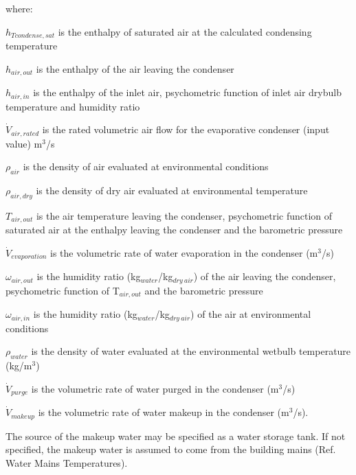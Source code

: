 where:

\({h_{Tcondense,sat}}\) is the enthalpy of saturated air at the calculated condensing temperature

\(h_{air,out}\) is the enthalpy of the air leaving the condenser

\(h_{air,in}\) is the enthalpy of the inlet air, psychometric function of inlet air drybulb temperature and humidity ratio

\({\dot V_{air,rated}}\) is the rated volumetric air flow for the evaporative condenser (input value) m\(^{3}\)/s

\(\rho_{air}\) is the density of air evaluated at environmental conditions

\(\rho_{air,dry}\) is the density of dry air evaluated at environmental temperature

\(T_{air,out}\) is the air temperature leaving the condenser, psychometric function of saturated air at the enthalpy leaving the condenser and the barometric pressure

\({\dot V_{evaporation}}\) is the volumetric rate of water evaporation in the condenser (m\(^{3}\)/s)

\(\omega_{air,out}\) is the humidity ratio (kg\(_{water}\)/kg\(_{dry~air}\)) of the air leaving the condenser, psychometric function of T\(_{air,out}\) and the barometric pressure

\(\omega_{air,in}\) is the humidity ratio (kg\(_{water}\)/kg\(_{dry~air}\)) of the air at environmental conditions

\(\rho_{water}\) is the density of water evaluated at the environmental wetbulb temperature (kg/m\(^{3}\))

\({\dot V_{purge}}\) is the volumetric rate of water purged in the condenser (m\(^{3}\)/s)

\({\dot V_{makeup}}\) is the volumetric rate of water makeup in the condenser (m\(^{3}\)/s).

The source of the makeup water may be specified as a water storage tank. If not specified, the makeup water is assumed to come from the building mains (Ref. Water Mains Temperatures).

